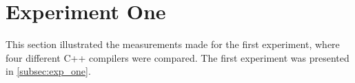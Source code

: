 \section{Experiment One}\label{app:exp_one}

This section illustrated the measurements made for the first experiment, where four different C++ compilers were compared. The first experiment was presented in \cref{subsec:exp_one}.

% 
% 
% 

% 


% 

